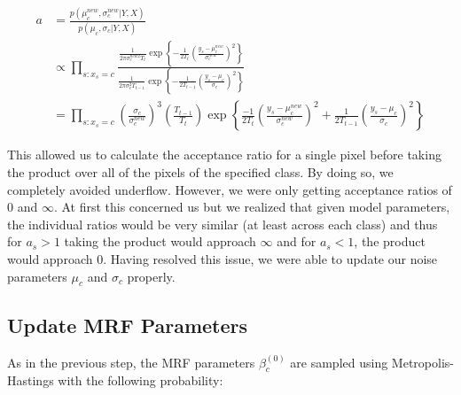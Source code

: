\documentclass[11pt]{article}
\begin{document}
\begin{equation}
\begin{aligned}
a & = \frac{p\left(\mu_{c}^{new}, \sigma_{c}^{new} | Y, X\right)}{p\left(\mu_{c}, \sigma_{c} | Y, X\right)}\\ & \propto \prod_{s: x_{s}=c}  \frac{\frac{1}{2 \pi \sigma_{c}^{new2} T_{t}} \exp \left\{-\frac{1}{2 T_{t}} \left(\frac{y_{s}-\mu_{c}^{new}}{\sigma_{c}^{new}}\right)^{2} \right\}}{\frac{1}{2 \pi \sigma_{c}^{2} T_{t-1}} \exp \left\{-\frac{1}{2 T_{t-1}} \left(\frac{y_{s}-\mu_{c}}{\sigma_{c}}\right)^{2} \right\}}\\
&= \prod_{s: x_s = c} \left( \frac{\sigma_c}{\sigma_c^{new}} \right)^{3} \left( \frac{T_{t-1}}{T_t} \right) \exp \left\{ \frac{-1}{2 T_t} \left( \frac{y_s - \mu_c^{new}}{\sigma_c^{new}} \right)^2 + \frac{1}{2 T_{t-1}} \left( \frac{y_s - \mu_c}{\sigma_c} \right)^2  \right\}
\end{aligned}
\end{equation}

This allowed us to calculate the acceptance ratio for a single pixel before taking the product over all of the pixels of the specified class.
By doing so, we completely avoided underflow. However, we were only getting acceptance ratios of $0$ and $\infty$.
At first this concerned us but we realized that given model parameters, the individual ratios would be very similar (at least across each class) and thus for $a_{s} > 1$ taking the product would approach $\infty$ and for $a_{s} < 1$, the product would approach 0.
Having resolved this issue, we were able to update our noise parameters $\mu_{c}$ and $\sigma_{c}$ properly.

\subsection{Update MRF Parameters}
As in the previous step, the MRF parameters $\beta_{c}^{(0)}$ are sampled using Metropolis-Hastings with the following probability:
\end{document}
